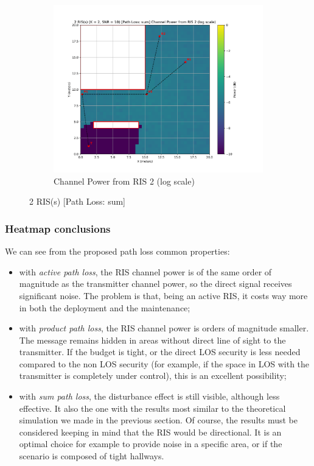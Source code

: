 \begin{figure}[H]
  \hfill
  \begin{subfigure}[b]{0.48\textwidth}
    \centering
    \includegraphics[width=\textwidth]{imgs/heatmap-simulations/2 RIS(s) (K = 2, SNR = 10) [Path Loss_ sum] Channel Power from RIS 2 (log scale).png}
    \caption{Channel Power from RIS 2 (log scale)}
  \end{subfigure}
  \caption{2 RIS(s) [Path Loss: sum]}
\end{figure}

\subsubsection{Heatmap conclusions}

We can see from the proposed path loss common properties:

\begin{itemize}
  \item with \textit{active path loss}, the RIS channel power is of the same order of magnitude as the transmitter channel power, so the direct signal receives significant noise. The problem is that, being an active RIS, it costs way more in both the deployment and the maintenance;
  \item with \textit{product path loss}, the RIS channel power is orders of magnitude smaller. The message remains hidden in areas without direct line of sight to the transmitter. If the budget is tight, or the direct LOS security is less needed compared to the non LOS security (for example, if the space in LOS with the transmitter is completely under control), this is an excellent possibility;
  \item with \textit{sum path loss}, the disturbance effect is still visible, although less effective. It also the one with the results most similar to the theoretical simulation we made in the previous section. Of course, the results must be considered keeping in mind that the RIS would be directional. It is an optimal choice for example to provide noise in a specific area, or if the scenario is composed of tight hallways.
\end{itemize}

